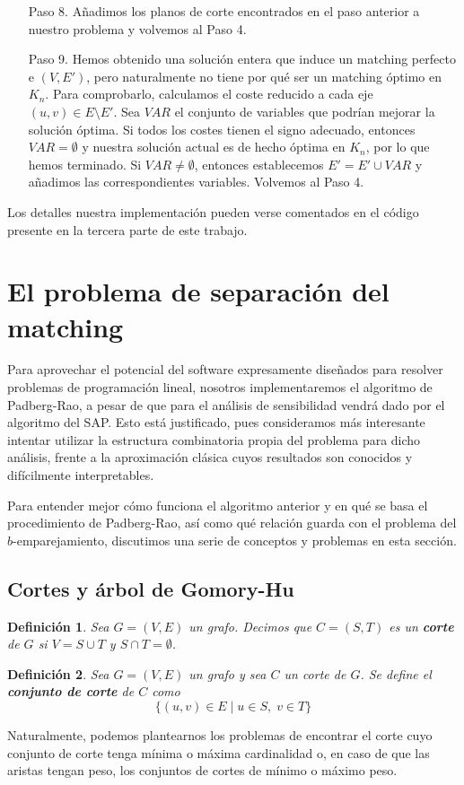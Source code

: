 \documentclass[twoside,a4paper,openright,12pt]{book}
\newtheorem{defi}{Definici\'on}[section]
\begin{document}
\begin{itemize}
\item[Paso 8.] Añadimos los planos de corte encontrados en el paso anterior a nuestro problema y volvemos al Paso 4.
\item[Paso 9.] Hemos obtenido una solución entera que induce un matching perfecto e $(V,E')$, pero naturalmente no tiene por qué ser un matching óptimo en $K_n$. Para comprobarlo, calculamos el coste reducido a cada eje $(u,v)\in E\setminus E'$. Sea $VAR$ el conjunto de variables que podrían mejorar la solución óptima. Si todos los costes tienen el signo adecuado, entonces $VAR=\emptyset$ y nuestra solución actual es de hecho óptima en $K_n$, por lo que hemos terminado. Si $VAR\neq \emptyset$, entonces establecemos $E'=E'\cup VAR$ y añadimos las correspondientes variables. Volvemos al Paso 4.
\end{itemize}
Los detalles nuestra implementación pueden verse comentados en el código presente en la tercera parte de este trabajo.
\section{El problema de separación del matching}
Para aprovechar el potencial del software expresamente diseñados para resolver problemas de programación lineal, nosotros implementaremos el algoritmo de Padberg-Rao, a pesar de que para el análisis de sensibilidad vendrá dado por el algoritmo del SAP. Esto está justificado, pues consideramos más interesante intentar utilizar la estructura combinatoria propia del problema para dicho análisis, frente a la aproximación clásica cuyos resultados son conocidos y difícilmente interpretables.

Para entender mejor cómo funciona el algoritmo anterior y en qué se basa el procedimiento de Padberg-Rao, así como qué relación guarda con el problema del $b$-emparejamiento, discutimos una serie de conceptos y problemas en esta sección.

\subsection{Cortes y árbol de Gomory-Hu} 
\begin{defi}
Sea $G = (V,E)$ un grafo. Decimos que $C=(S,T)$ es un \textbf{corte} de $G$ si $V = S \cup T$ y $S\cap T = \emptyset$.
\end{defi}
\begin{defi}
Sea $G=(V,E)$ un grafo y sea $C$ un corte de $G$. Se define el \textbf{conjunto de corte} de $C$ como
$$
\{(u,v)\in E \mid u \in S,\; v\in T\}
$$ 
\end{defi}
Naturalmente, podemos plantearnos los problemas de encontrar el corte cuyo conjunto de corte tenga mínima o máxima cardinalidad o, en caso de que las aristas tengan peso, los conjuntos de cortes de mínimo o máximo peso. 
\end{document}
